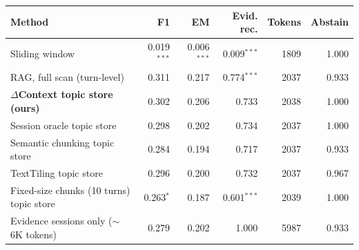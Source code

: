 \begin{tabular}{lrrrrr}
\toprule
Method & F1 & EM & Evid. rec. & Tokens & Abstain \\
\midrule
Sliding window & 0.019$^{***}$ & 0.006$^{***}$ & 0.009$^{***}$ & 1809 & 1.000 \\
RAG, full scan (turn-level) & 0.311 & 0.217 & 0.774$^{***}$ & 2037 & 0.933 \\
\textbf{$\Delta$Context topic store (ours)} & 0.302 & 0.206 & 0.733 & 2038 & 1.000 \\
Session oracle topic store & 0.298 & 0.202 & 0.734 & 2037 & 1.000 \\
Semantic chunking topic store & 0.284 & 0.194 & 0.717 & 2037 & 0.933 \\
TextTiling topic store & 0.296 & 0.200 & 0.732 & 2037 & 0.967 \\
Fixed-size chunks (10 turns) topic store & 0.263$^{*}$ & 0.187 & 0.601$^{***}$ & 2039 & 1.000 \\
\midrule
Evidence sessions only ($\sim$6K tokens) & 0.279 & 0.202 & 1.000 & 5987 & 0.933 \\
\bottomrule
\end{tabular}
